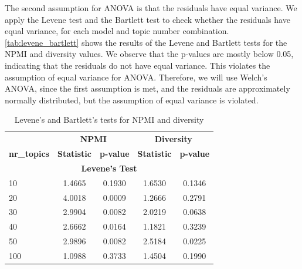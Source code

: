 The second assumption for ANOVA is that the residuals have equal variance. We apply the Levene test and the Bartlett test to check whether the residuals have equal variance, for each model and topic number combination. \cref{tab:levene_bartlett} shows the results of the Levene and Bartlett tests for the NPMI and diversity values. We observe that the p-values are mostly below 0.05, indicating that the residuals do not have equal variance. This violates the assumption of equal variance for ANOVA. Therefore, we will use Welch's ANOVA, since the first assumption is met, and the residuals are approximately normally distributed, but the assumption of equal variance is violated.

\begin{table}[htbp]
    \centering
    \caption{Levene's and Bartlett's tests for NPMI and diversity}
    \begin{tabular}{@{}lcc|cc@{}}
        \toprule
                            & \multicolumn{2}{c}{\textbf{NPMI}} & \multicolumn{2}{c}{\textbf{Diversity}}                                         \\ \cmidrule(lr){2-3} \cmidrule(lr){4-5}
        \textbf{nr\_topics} & \textbf{Statistic}                & \textbf{p-value}                       & \textbf{Statistic} & \textbf{p-value} \\ \midrule
        \multicolumn{5}{c}{\textbf{Levene's Test}}                                                                                               \\ \midrule
        10                  & 1.4665                            & 0.1930                                 & 1.6530             & 0.1346           \\
        20                  & 4.0018                            & 0.0009                                 & 1.2666             & 0.2791           \\
        30                  & 2.9904                            & 0.0082                                 & 2.0219             & 0.0638           \\
        40                  & 2.6662                            & 0.0164                                 & 1.1821             & 0.3239           \\
        50                  & 2.9896                            & 0.0082                                 & 2.5184             & 0.0225           \\
        100                 & 1.0988                            & 0.3733                                 & 1.4504             & 0.1990           \\

\end{tabular}
\end{table}

